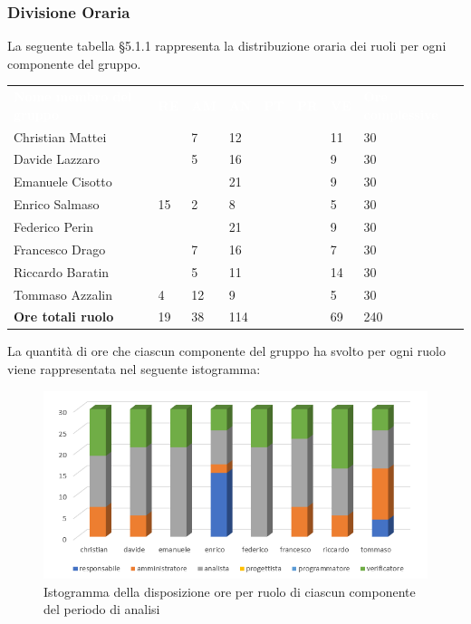 \subsubsection{Divisione Oraria}
La seguente tabella §5.1.1 rappresenta la distribuzione oraria dei ruoli per ogni componente del gruppo.
{
	\renewcommand{\arraystretch}{2}
	\centering
	\begin{longtable}{ C{5cm} C{1cm} C{1cm} C{1cm} C{1cm} C{1cm} C{1cm} C{3cm}}
		\textcolor{white}{\textbf{Nome membro del gruppo}} & \textcolor{white}{\textbf{RE}} & \textcolor{white}{\textbf{AM}} & \textcolor{white}{\textbf{AN}} & \textcolor{white}{\textbf{PT}} & \textcolor{white}{\textbf{PR}} & \textcolor{white}{\textbf{VE}} & \textcolor{white}{\textbf{Ore complessive}}\\	
        
        
        Christian Mattei     &  & 7 & 12 &  & & 11 & 30 \\
		Davide Lazzaro       &  & 5 & 16 &  &  & 9 & 30 \\
        Emanuele Cisotto     &  &  & 21 &  &  & 9 & 30 \\
        Enrico Salmaso       & 15 & 2 & 8  &  &  & 5 & 30 \\
        Federico Perin       &  &  & 21 &  &  & 9 & 30 \\
        Francesco Drago      &  & 7 & 16 &  &  & 7 & 30 \\
        Riccardo Baratin     &  & 5 & 11 &  &  & 14 & 30 \\
        Tommaso Azzalin      & 4 & 12 & 9  &  &  & 5 & 30 \\
        \textbf{Ore totali ruolo} & 19 & 38 & 114 &  &  & 69 & 240 \\
		
	\end{longtable}
}

La quantità di ore che ciascun componente del gruppo ha svolto per ogni ruolo viene rappresentata nel seguente istogramma:

\begin{figure}[h]
	\centering
	\includegraphics[scale=0.45]{sezioni/Istogrammi/IstogrammaAnalisi.png}
	\caption{Istogramma della disposizione ore per ruolo di ciascun componente del periodo di analisi}
\end{figure}

